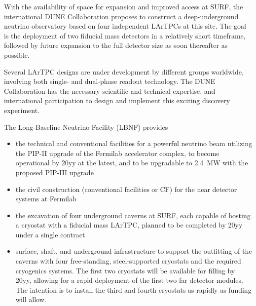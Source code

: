 
With the availability of space for expansion and improved access at SURF, %
the international DUNE Collaboration proposes to construct a deep-underground neutrino observatory based on four independent  LArTPCs at this site. %
The goal is the deployment of two  fiducial mass detectors in a relatively short timeframe, followed by future expansion to the full detector size as soon thereafter as possible. 

Several LArTPC designs are under development by different groups worldwide, involving both single- and dual-phase readout technology.
The DUNE %
Collaboration has the necessary scientific and technical expertise, %
and international participation  to design and implement this exciting discovery experiment. 

The Long-Baseline Neutrino Facility (LBNF) provides

\begin{itemize}

\item  the  technical and conventional facilities for a powerful  neutrino beam utilizing the PIP-II upgrade of the Fermilab accelerator 
complex, to become operational by 20yy %
at the latest, and to be upgradable to \SI{2.4}{\MW} with the proposed 
PIP-III upgrade

\item  the civil construction (conventional facilities or CF) for the near detector systems at Fermilab 

\item the excavation of four underground caverns at SURF, each capable of hosting a cryostat 
with a  fiducial mass LArTPC, %
planned to be completed 
by 20yy %
under a single contract

\item surface, shaft, and underground infrastructure to support 
the outfitting of the caverns with four free-standing, steel-supported cryostats 
and the required cryogenics systems. The first two cryostats will be available for filling by
20yy, %
allowing for a rapid deployment of the first two  far detector modules. 
The intention is to install the third and fourth cryostats as rapidly as funding will 
allow.

\end{itemize}

